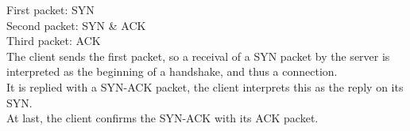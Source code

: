 First packet: SYN \\
Second packet: SYN \& ACK \\
Third packet: ACK \\

The client sends the first packet, so a receival of a SYN packet by the server is interpreted as the beginning of a handshake, and thus a connection.\\
It is replied with a SYN-ACK packet, the client interprets this as the reply on its SYN.\\
At last, the client confirms the SYN-ACK with its ACK packet.